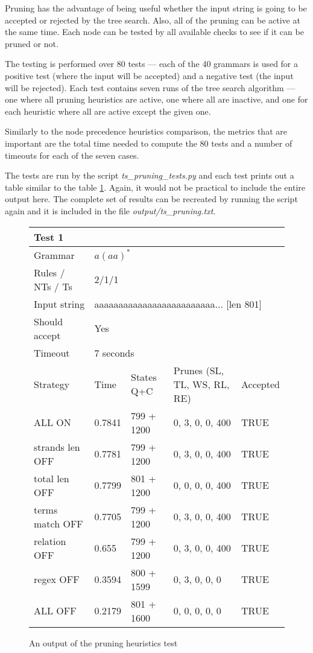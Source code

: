 Pruning has the advantage of being useful whether the input string is going to be accepted or rejected by the tree search. Also, all of the pruning can be active at the same time. Each node can be tested by all available checks to see if it can be pruned or not.

The testing is performed over 80 tests --- each of the 40 grammars is used for a positive test (where the input will be accepted) and a negative test (the input will be rejected).
Each test contains seven runs of the tree search algorithm --- one where all pruning heuristics are active, one where all are inactive, and one for each heuristic where all are active except the given one.

Similarly to the node precedence heuristics comparison, the metrics that are important are the total time needed to compute the 80 tests and a number of timeouts for each of the seven cases.

The tests are run by the script \textit{ts\_pruning\_tests.py} and each test prints out a table similar to the table \ref{tab:prune_heuristics_table}. Again, it would not be practical to include the entire output here. The complete set of results can be recreated by running the script again and it is included in the file \textit{output/ts\_pruning.txt}.

\begin{figure}[h!]
  \caption{An output of the pruning heuristics test}
  \label{tab:prune_heuristics_table}
\begin{tabular}{ |l|l|l|l|l|  }
  \hline
  \multicolumn{5}{|l|}{Test 1} \\
  \hline
  Grammar & \multicolumn{4}{|l|}{$a(aa)^*$} \\
  Rules / NTs / Ts & \multicolumn{4}{|l|}{2/1/1} \\
  Input string & \multicolumn{4}{|l|}{aaaaaaaaaaaaaaaaaaaaaaaaa... [len 801]} \\
  Should accept & \multicolumn{4}{|l|}{Yes} \\
  Timeout & \multicolumn{4}{|l|}{7 seconds} \\
  \hline
  Strategy & Time & States Q+C & Prunes (SL, TL, WS, RL, RE)& Accepted \\
  \hline
  ALL ON & 0.7841 & 799 + 1200 & 0, 3, 0, 0, 400 & TRUE \\
  strands len OFF & 0.7781 & 799 + 1200 & 0, 3, 0, 0, 400 & TRUE \\
  total len OFF & 0.7799 & 801 + 1200 & 0, 0, 0, 0, 400 & TRUE \\
  terms match OFF & 0.7705 & 799 + 1200 & 0, 3, 0, 0, 400 & TRUE \\
  relation OFF & 0.655 & 799 + 1200 & 0, 3, 0, 0, 400 & TRUE \\
  regex OFF & 0.3594 & 800 + 1599 & 0, 3, 0, 0, 0 & TRUE \\
  ALL OFF & 0.2179 & 801 + 1600 & 0, 0, 0, 0, 0 & TRUE \\
  \hline
  \hline
\end{tabular}
\end{figure}

